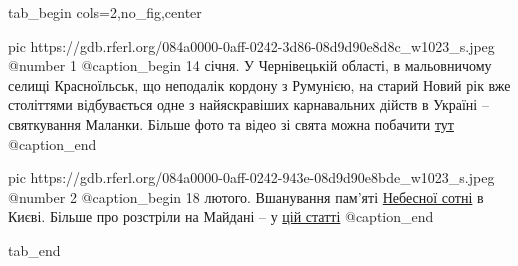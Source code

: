  
 
 
 
 

\ifcmt
  tab_begin cols=2,no_fig,center

     pic https://gdb.rferl.org/084a0000-0aff-0242-3d86-08d9d90e8d8c_w1023_s.jpeg
     @number 1
     @caption_begin
14 січня. У Чернівецькій області, в мальовничому селищі Красноїльськ, що
неподалік кордону з Румунією, на старий Новий рік вже століттями
відбувається одне з найяскравіших карнавальних дійств в Україні –
святкування Маланки. Більше фото та відео зі свята можна побачити 
\href{https://www.radiosvoboda.org/a/31048285.html}{тут} 
     @caption_end

     pic https://gdb.rferl.org/084a0000-0aff-0242-943e-08d9d90e8bde_w1023_s.jpeg
     @number 2
     @caption_begin
18 лютого. Вшанування пам'яті
\href{https://www.radiosvoboda.org/a/photo-nebesna-sotnya-vshanuvannya-kyiv/31109687.html}{Небесної
сотні} в Києві. Більше про розстріли на Майдані – у \href{https://www.radiosvoboda.org/a/dbr-i-henprokuror-pro-zavershennya-rozsliduvannya-rozstriliv-na-maydani/31564810.html}{цій статті}
     @caption_end

  tab_end
\fi
